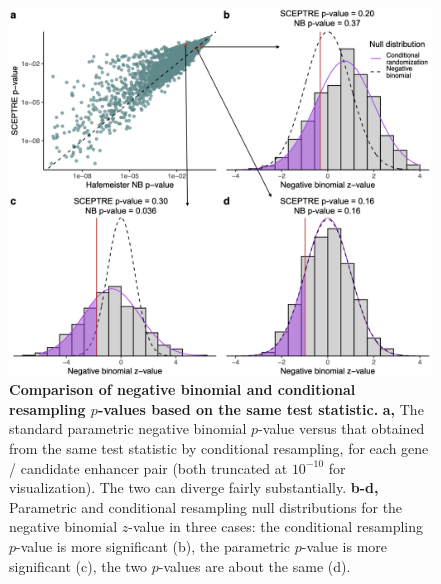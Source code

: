 \documentclass{article}
\begin{document}
\thispagestyle{empty} 
\begin{figure}
	\includegraphics[width = \textwidth]{FigureS2.png}
	\caption{\textbf{Comparison of negative binomial and conditional resampling $p$-values based on the same test statistic.} \textbf{a,} The standard parametric negative binomial $p$-value versus that obtained from the same test statistic by conditional resampling, for each gene / candidate enhancer pair (both truncated at $10^{-10}$ for visualization). The two can diverge fairly substantially. \textbf{b-d,} Parametric and conditional resampling null distributions for the negative binomial $z$-value in three cases: the conditional resampling $p$-value is more significant (b), the parametric $p$-value is more significant (c), the two $p$-values are about the same (d).}
	\label{fig:NB-vs-CP}
 \end{figure}
\end{document}
